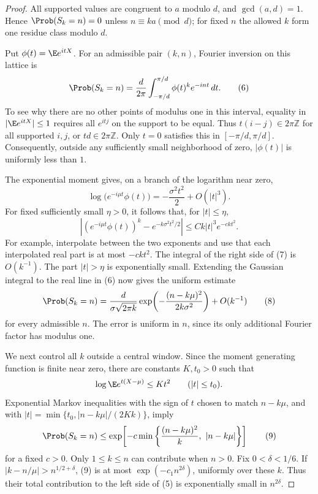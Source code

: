 \documentclass[11pt,a4paper]{article}
\numberwithin{equation}{section}
\theoremstyle{definition}
\theoremstyle{remark}
\begin{document}
\begin{proof}
All supported values are congruent to $a$ modulo $d$, and
$\gcd(a,d)=1$.  Hence $\Prob(S_k=n)=0$ unless
$n\equiv ka\pmod d$; for fixed $n$ the allowed $k$ form one residue
class modulo $d$.

Put $\phi(t)=\E e^{itX}$.  For an admissible pair $(k,n)$, Fourier
inversion on this lattice is
\[
 \Prob(S_k=n)=\frac{d}{2\pi}
   \int_{-\pi/d}^{\pi/d}\phi(t)^k e^{-int}\,dt.       \tag{6}
\]
To see why there are no other points of modulus one in this interval,
equality in $|\E e^{itX}|\le1$ requires all $e^{itj}$ on the support
to be equal.  Thus $t(i-j)\in2\pi\mathbb Z$ for all supported $i,j$,
or $td\in2\pi\mathbb Z$.  Only $t=0$ satisfies this in
$[-\pi/d,\pi/d]$.  Consequently, outside any sufficiently small
neighborhood of zero, $|\phi(t)|$ is uniformly less than $1$.

The exponential moment gives, on a branch of the logarithm near zero,
\[
 \log\bigl(e^{-i\mu t}\phi(t)\bigr)
       =-\frac{\sigma^2t^2}{2}+O(|t|^3).
\]
For fixed sufficiently small $\eta>0$, it follows that, for
$|t|\le\eta$,
\[
 \left|(e^{-i\mu t}\phi(t))^k
             -e^{-k\sigma^2t^2/2}\right|
       \le Ck|t|^3e^{-c kt^2}.                      \tag{7}
\]
For example, interpolate between the two exponents and use that each
interpolated real part is at most $-c kt^2$.  The integral of the
right side of (7) is $O(k^{-1})$.  The part $|t|>\eta$ is exponentially
small.  Extending the Gaussian integral to the real line in (6) now
gives the uniform estimate
\[
 \Prob(S_k=n)=
 \frac{d}{\sigma\sqrt{2\pi k}}
 \exp\!\left(-\frac{(n-k\mu)^2}{2k\sigma^2}\right)
       +O(k^{-1})                                  \tag{8}
\]
for every admissible $n$.  The error is uniform in $n$, since its only
additional Fourier factor has modulus one.

We next control all $k$ outside a central window.  Since the moment
generating function is finite near zero, there are constants $K,t_0>0$
such that
\[
 \log\E e^{t(X-\mu)}\le Kt^2\qquad(|t|\le t_0).
\]
Exponential Markov inequalities with the sign of $t$ chosen to match
$n-k\mu$, and with
$|t|=\min\{t_0,|n-k\mu|/(2Kk)\}$, imply
\[
 \Prob(S_k=n)\le
 \exp\!\left[-c\min\left\{
       \frac{(n-k\mu)^2}{k},\ |n-k\mu|\right\}\right]
                                                        \tag{9}
\]
for a fixed $c>0$.  Only $1\le k\le n$ can contribute when $n>0$.
Fix $0<\delta<1/6$.  If
$|k-n/\mu|>n^{1/2+\delta}$, (9) is at most
$\exp(-c_1n^{2\delta})$, uniformly over these $k$.  Thus their total
contribution to the left side of (5) is exponentially small in
$n^{2\delta}$.


\end{proof}
\end{document}
